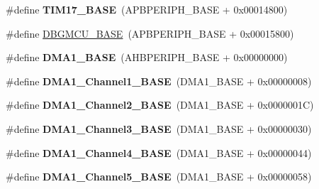 \begin{DoxyCompactItemize}
\item 
\mbox{\label{group___peripheral__memory__map_gaffbedbe30e8c4cffdea326d6c1800574}} 
\#define {\bfseries T\+I\+M17\+\_\+\+B\+A\+SE}~(A\+P\+B\+P\+E\+R\+I\+P\+H\+\_\+\+B\+A\+SE + 0x00014800)
\item 
\#define \hyperlink{group___peripheral__memory__map_ga4adaf4fd82ccc3a538f1f27a70cdbbef}{D\+B\+G\+M\+C\+U\+\_\+\+B\+A\+SE}~(A\+P\+B\+P\+E\+R\+I\+P\+H\+\_\+\+B\+A\+SE + 0x00015800)
\item 
\mbox{\label{group___peripheral__memory__map_gab2d8a917a0e4ea99a22ac6ebf279bc72}} 
\#define {\bfseries D\+M\+A1\+\_\+\+B\+A\+SE}~(A\+H\+B\+P\+E\+R\+I\+P\+H\+\_\+\+B\+A\+SE + 0x00000000)
\item 
\mbox{\label{group___peripheral__memory__map_ga888dbc1608243badeb3554ffedc7364c}} 
\#define {\bfseries D\+M\+A1\+\_\+\+Channel1\+\_\+\+B\+A\+SE}~(D\+M\+A1\+\_\+\+B\+A\+SE + 0x00000008)
\item 
\mbox{\label{group___peripheral__memory__map_ga38a70090eef3687e83fa6ac0c6d22267}} 
\#define {\bfseries D\+M\+A1\+\_\+\+Channel2\+\_\+\+B\+A\+SE}~(D\+M\+A1\+\_\+\+B\+A\+SE + 0x0000001\+C)
\item 
\mbox{\label{group___peripheral__memory__map_ga70b3d9f36ca9ce95b4e421c11154fe5d}} 
\#define {\bfseries D\+M\+A1\+\_\+\+Channel3\+\_\+\+B\+A\+SE}~(D\+M\+A1\+\_\+\+B\+A\+SE + 0x00000030)
\item 
\mbox{\label{group___peripheral__memory__map_ga1adc93cd0baf0897202c71110e045692}} 
\#define {\bfseries D\+M\+A1\+\_\+\+Channel4\+\_\+\+B\+A\+SE}~(D\+M\+A1\+\_\+\+B\+A\+SE + 0x00000044)
\item 
\mbox{\label{group___peripheral__memory__map_gac041a71cd6c1973964f847a68aa14478}} 
\#define {\bfseries D\+M\+A1\+\_\+\+Channel5\+\_\+\+B\+A\+SE}~(D\+M\+A1\+\_\+\+B\+A\+SE + 0x00000058)
\item 
\mbox{\label{group___peripheral__memory__map_ga0e681b03f364532055d88f63fec0d99d}} 

\end{DoxyCompactItemize}
